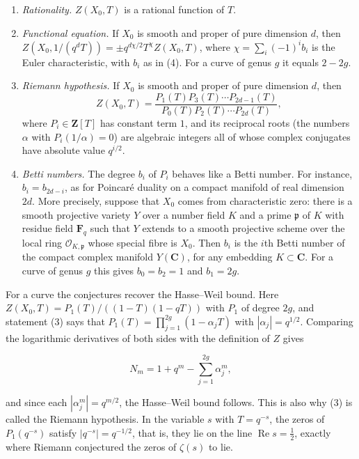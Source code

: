 \documentclass[11pt]{article}
\begin{document}
\begin{enumerate}
\item \emph{Rationality.} \(Z(X_0,T)\) is a rational function of \(T\).
\item \emph{Functional equation.} If \(X_0\) is smooth and proper of pure dimension \(d\), then \(Z(X_0,1/(q^dT))=\pm q^{d\chi/2}T^{\chi}Z(X_0,T)\), where \(\chi=\sum_i(-1)^ib_i\) is the Euler characteristic, with \(b_i\) as in (4). For a curve of genus \(g\) it equals \(2-2g\).
\item \emph{Riemann hypothesis.} If \(X_0\) is smooth and proper of pure dimension \(d\), then \[
   Z(X_0,T)=\frac{P_1(T)P_3(T)\cdots P_{2d-1}(T)}
   {P_0(T)P_2(T)\cdots P_{2d}(T)},
   \] where \(P_i\in\mathbf Z[T]\) has constant term \(1\), and its reciprocal roots (the numbers \(\alpha\) with \(P_i(1/\alpha)=0\)) are algebraic integers all of whose complex conjugates have absolute value \(q^{i/2}\).
\item \emph{Betti numbers.} The degree \(b_i\) of \(P_i\) behaves like a Betti number. For instance, \(b_i=b_{2d-i}\), as for Poincaré duality on a compact manifold of real dimension \(2d\). More precisely, suppose that \(X_0\) comes from characteristic zero: there is a smooth projective variety \(Y\) over a number field \(K\) and a prime \(\mathfrak p\) of \(K\) with residue field \(\mathbf F_q\) such that \(Y\) extends to a smooth projective scheme over the local ring \(\mathcal O_{K,\mathfrak p}\) whose special fibre is \(X_0\). Then \(b_i\) is the \(i\)th Betti number of the compact complex manifold \(Y(\mathbf C)\), for any embedding \(K\subset\mathbf C\). For a curve of genus \(g\) this gives \(b_0=b_2=1\) and \(b_1=2g\).
\end{enumerate}

For a curve the conjectures recover the Hasse–Weil bound. Here \(Z(X_0,T)=P_1(T)/((1-T)(1-qT))\) with \(P_1\) of degree \(2g\), and statement (3) says that \(P_1(T)=\prod_{j=1}^{2g}(1-\alpha_jT)\) with \(|\alpha_j|=q^{1/2}\). Comparing the logarithmic derivatives of both sides with the definition of \(Z\) gives

\[
N_m=1+q^m-\sum_{j=1}^{2g}\alpha_j^m,
\]

and since each \(|\alpha_j^m|=q^{m/2}\), the Hasse–Weil bound follows. This is also why (3) is called the Riemann hypothesis. In the variable \(s\) with \(T=q^{-s}\), the zeros of \(P_1(q^{-s})\) satisfy \(|q^{-s}|=q^{-1/2}\), that is, they lie on the line \(\operatorname{Re}s=\tfrac12\), exactly where Riemann conjectured the zeros of \(\zeta(s)\) to lie.
\end{document}
